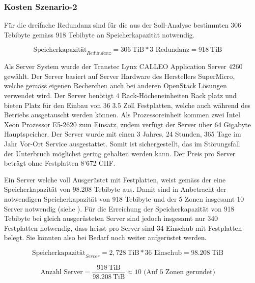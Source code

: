 \subsubsection{Kosten Szenario-2}

Für die dreifache Redundanz sind für die aus der Soll-Analyse bestimmten 306 Tebibyte gemäss  918 Tebibyte an Speicherkapazität notwendig.

\begin{equation}
\mbox{Speicherkapazität}_{Redundanz} = 306  \mathrm{\ TiB} * 3 \mbox{\ Redundanz} =  918 \mathrm{\ TiB}
\label{eqn:SpeicherkapazitätS2}
\end{equation}


Als Server System wurde der Transtec Lynx CALLEO Application Server 4260 gewählt. Der Server basiert auf Server Hardware des Herstellers  SuperMicro, welche gemäss eigenen Recherchen auch bei anderen OpenStack Lösungen verwendet wird. Der Server benötigt 4 Rack-Höcheneinheiten Rack platz und bieten Platz für den Einbau von 36 3.5 Zoll Festplatten, welche auch während des Betriebs ausgetauscht werden können. Als Prozessoreinheit kommen zwei Intel Xeon Prozessor E5-2620 zum Einsatz, zudem verfügt der Server über 64 Gigabyte Hauptspeicher. Der Server wurde mit einen 3 Jahres, 24 Stunden, 365 Tage im Jahr Vor-Ort Service ausgestattet. Somit ist sichergestellt, das im Störungsfall der Unterbruch möglichst gering gehalten werden kann. Der Preis pro Server beträgt ohne Festplatten 8'672 CHF.


Ein Server welche voll Ausgerüstet mit Festplatten, weist gemäss der   eine Speicherkapazität von 98.208 Tebibyte aus. Damit sind in Anbetracht der notwendigen Speicherkapazität von 918 Tebibyte und der 5 Zonen insgesamt 10 Server notwendig (siehe ). Für die Erreichung der Speicherkapazität von 918 Tebibyte bei gleich ausgerüsteten Server sind jedoch insgesamt nur 340 Festplatten notwendig, dass heisst pro Server sind 34 Einschub mit Festplatten belegt. Sie könnten also bei Bedarf noch weiter aufgerüstet werden.

\begin{equation}
\mbox{Speicherkapazität}_{Server} = 2,728 \mathrm{\ TiB} * 36 \mbox{\ Einschub} =  98.208 \mathrm{\ TiB}
\label{eqn:SpeicherkapazitätServerS2}
\end{equation}

\begin{equation}
\mbox{Anzahl Server} = \frac{918 \mathrm{\ TiB}}{98.208 \mathrm{\ TiB}} \approx  10 \mbox{\ (Auf 5 Zonen gerundet)}
\label{eqn:AnzahlServerS2}
\end{equation}

